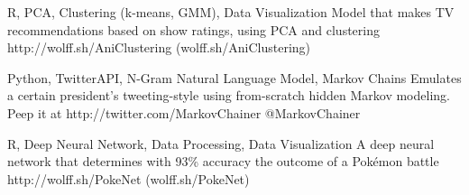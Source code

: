 \documentclass[10pt, letterpaper]{awesome-cv}
\begin{document}
\begin{cventries}
\end{cventries}

\begin{projects}
    {R, PCA, Clustering (k-means, GMM), Data Visualization}
    {Model that makes TV recommendations based on show ratings, using PCA and clustering}
    {http://wolff.sh/AniClustering}
    {(wolff.sh/AniClustering)}
    
    {Python, TwitterAPI, N-Gram Natural Language Model, Markov Chains}
    {Emulates a certain president's tweeting-style using from-scratch hidden Markov modeling. Peep it at}
    {http://twitter.com/MarkovChainer}
    {@MarkovChainer}
    
    {R, Deep Neural Network, Data Processing, Data Visualization}
    {A deep neural network that determines with 93\% accuracy the outcome of a Pokémon battle}
    {http://wolff.sh/PokeNet}
    {(wolff.sh/PokeNet)}
\end{projects}
    
\end{document}
